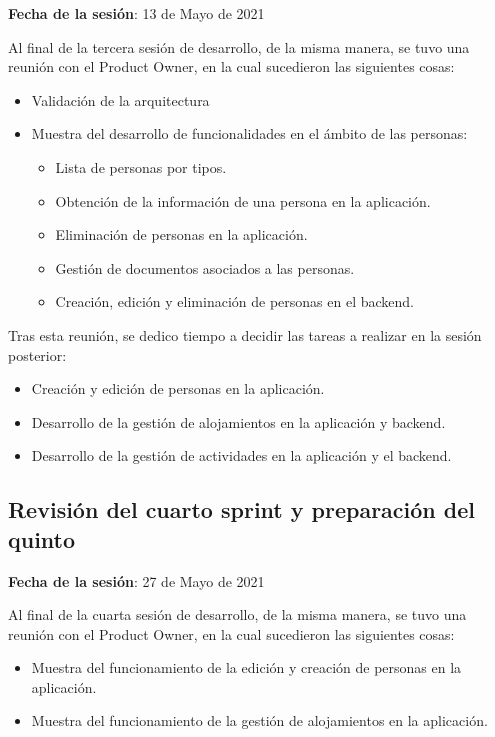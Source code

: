 \textbf{Fecha de la sesión}: 13 de Mayo de 2021

Al final de la tercera sesión de desarrollo, de la misma manera, se tuvo una reunión con el Product Owner, en la cual sucedieron las siguientes cosas: 

\begin{itemize}
    \item Validación de la arquitectura
    \item Muestra del desarrollo de funcionalidades en el ámbito de las personas:
    \begin{itemize}
        \item Lista de personas por tipos.
        \item Obtención de la información de una persona en la aplicación.
        \item Eliminación de personas en la aplicación.
        \item Gestión de documentos asociados a las personas.
        \item Creación, edición y eliminación de personas en el backend.
    \end{itemize}
\end{itemize}

Tras esta reunión, se dedico tiempo a decidir las tareas a realizar en la sesión posterior:

\begin{itemize}
    \item Creación y edición de personas en la aplicación.
    \item Desarrollo de la gestión de alojamientos en la aplicación y backend.
    \item Desarrollo de la gestión de actividades en la aplicación y el backend.
\end{itemize}

\subsection{Revisión del cuarto sprint y preparación del quinto}

\textbf{Fecha de la sesión}: 27 de Mayo de 2021

Al final de la cuarta sesión de desarrollo, de la misma manera, se tuvo una reunión con el Product Owner, en la cual sucedieron las siguientes cosas: 

\begin{itemize}
    \item Muestra del funcionamiento de la edición y creación de personas en la aplicación.
    \item Muestra del funcionamiento de la gestión de alojamientos en la aplicación.
\end{itemize}


